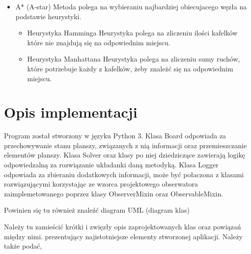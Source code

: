 \documentclass{classrep}
\begin{document}
{\begin{itemize}
            Metoda polega na przeszukiwaniu w głąb, oznacza to że zanim zbada kolejną krawedź pierwszego węzła
            dopiero gdy zbada wszystkie krawędzie kolejnego węzła
            \item A* (A-star)
                Metoda polega na wybieraniu najbardziej obiecujacego węzła na podstawie heurystyki.
                \begin{itemize}
                    \item Heurystyka Hamminga
                        Heurystyka polega na zliczeniu ilości kafelków które nie znajdują się na odpowiednim miejscu.
                    \item Heurystyka Manhattana
                        Heurystyka polega na zliczeniu sumy ruchów, które potrzebuje każdy z kafelków, żeby znależć się na odpowiednim miejscu.
                \end{itemize}
        \end{itemize}

    }

    \section{Opis implementacji}
    {\color{blue}
    Program został stworzony w języku Python 3.
    Klasa Board odpowiada za przechowywanie stanu planszy, związanych z nią informacji oraz
    przemieszczanie elementów planszy.
    Klasa Solver oraz klasy po niej dziedziczące zawierają logikę odpowiedzalną za rozwiązanie układanki daną metodyką.
    Klasa Logger odpowiada za zbieraniu dodatkowych informacji, może być połaczona z klasami rozwiązującymi
    korzystając ze wzorca projektowego obserwatora zaimplemetowanego poprzez klasy ObserverMixin oraz ObservableMixin.

    Powinien się tu również znaleźć diagram UML (diagram klas)


    Należy tu zamieścić krótki i zwięzły opis zaprojektowanych klas oraz powiązań
    między nimi.
        prezentujący najistotniejsze elementy stworzonej aplikacji. Należy także podać,




    }
\end{document}
